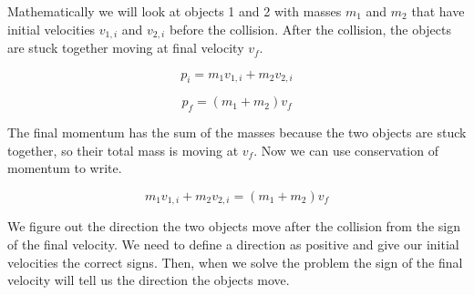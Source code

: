 \documentclass[12pt]{book}
\begin{document}
Mathematically we will look at objects 1 and 2 with masses $m_1$ and $m_2$ that have initial velocities $v_{1,i}$ and $v_{2,i}$ before the collision. After the collision, the objects are stuck together moving at final velocity $v_f$. 

\begin{equation}
p_i = m_1 v_{1,i} + m_2 v_{2,i}
\end{equation}

\begin{equation}
p_f = (m_1 + m_2) v_f
\end{equation}

The final momentum has the sum of the masses because the two objects are stuck together, so their total mass is moving at $v_f$. Now we can use conservation of momentum to write.

\begin{equation}
m_1 v_{1,i} + m_2 v_{2,i} = (m_1 + m_2) v_f
\label{inelastic}
\end{equation}

We figure out the direction the two objects move after the collision from the sign of the final velocity. We need to define a direction as positive and give our initial velocities the correct signs. Then, when we solve the problem the sign of the final velocity will tell us the direction the objects move.
\end{document}
